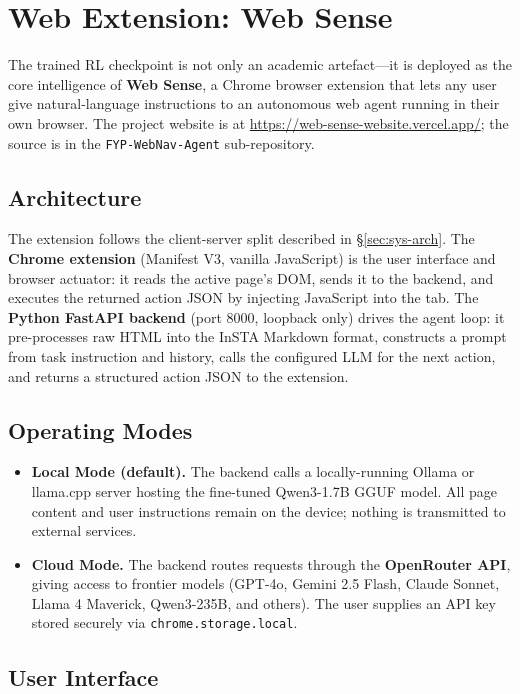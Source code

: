 \documentclass[12pt,a4paper]{report}
\begin{document}
\section{Web Extension: Web Sense}\label{sec:websense}

The trained RL checkpoint is not only an academic artefact---it is deployed as the core intelligence of \textbf{Web Sense}, a Chrome browser extension that lets any user give natural-language instructions to an autonomous web agent running in their own browser. The project website is at \url{https://web-sense-website.vercel.app/}; the source is in the \texttt{FYP-WebNav-Agent} sub-repository.

\subsection*{Architecture}

The extension follows the client-server split described in \S\ref{sec:sys-arch}. The \textbf{Chrome extension} (Manifest V3, vanilla JavaScript) is the user interface and browser actuator: it reads the active page's DOM, sends it to the backend, and executes the returned action JSON by injecting JavaScript into the tab. The \textbf{Python FastAPI backend} (port 8000, loopback only) drives the agent loop: it pre-processes raw HTML into the InSTA Markdown format, constructs a prompt from task instruction and history, calls the configured LLM for the next action, and returns a structured action JSON to the extension.

\subsection*{Operating Modes}

\begin{itemize}
  \item \textbf{Local Mode (default).} The backend calls a locally-running Ollama or llama.cpp server hosting the fine-tuned Qwen3-1.7B GGUF model. All page content and user instructions remain on the device; nothing is transmitted to external services.
  \item \textbf{Cloud Mode.} The backend routes requests through the \textbf{OpenRouter API}, giving access to frontier models (GPT-4o, Gemini 2.5 Flash, Claude Sonnet, Llama 4 Maverick, Qwen3-235B, and others). The user supplies an API key stored securely via \texttt{chrome.storage.local}.
\end{itemize}

\subsection*{User Interface}
\end{document}
